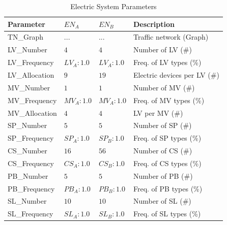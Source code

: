 \begin{table}[h]
	\renewcommand{\arraystretch}{1.3}
	\caption{Electric System Parameters}
	\centering
	\begin{tabular}{llll}
		\hline
		\textbf{Parameter}     & \textbf{$EN_{A}$} & \textbf{$EN_{B}$}       & \textbf{Description} \\ \hline
		TN\_Graph              & $...$ & $...$    	  & Traffic network (Graph)     \\
		LV\_Number             & $4$ & $4$            & Number of LV (\#)      \\
		LV\_Frequency          & $LV_{A}:1.0$ & $LV_{A}:1.0$                & Freq. of LV types (\%)      \\
		LV\_Allocation         & $9$ & $19$                 & Electric devices per LV (\#)      \\   
		MV\_Number             & $1$ & $1$        & Number of MV (\#)      \\ 
		MV\_Frequency          & $MV_{A}:1.0$ & $MV_{A}:1.0$                & Freq. of MV types (\%)      \\
		MV\_Allocation         & $4$ & $4$                     & LV per MV (\#)      \\   
		SP\_Number             & $5$ & $5$         & Number of SP (\#)      \\ 
		SP\_Frequency          & $SP_{A}:1.0$ & $SP_{B}:1.0$                & Freq. of SP types (\%)       \\  
		CS\_Number             & $16$  & $56$           & Number of CS (\#)      \\
		CS\_Frequency          & $CS_{A}:1.0$  & $CS_{B}:1.0$               & Freq. of CS types (\%)       \\   
		PB\_Number          & $5$  & $5$              & Number of PB (\#)      \\
		PB\_Frequency          & $PB_{A}:1.0$ & $PB_{B}:1.0$              & Freq. of PB types (\%)       \\ 
		SL\_Number          & $10$ & $10$              & Number of SL (\#)      \\
		SL\_Frequency          & $SL_{A}:1.0$ & $SL_{B}:1.0$              & Freq. of SL types (\%)       \\  \hline  
	\end{tabular}
\end{table}


